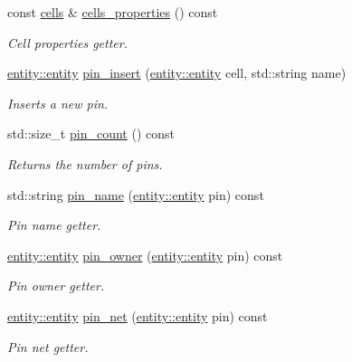 \begin{DoxyCompactItemize}
const \hyperlink{classophidian_1_1netlist_1_1cells}{cells} \& \hyperlink{classophidian_1_1netlist_1_1netlist_a0e57e192f8dcae8f15531f609274d3e5}{cells\-\_\-properties} () const 
\begin{DoxyCompactList}\small\item\em Cell properties getter. \end{DoxyCompactList}\item 
\hyperlink{classophidian_1_1entity_1_1entity}{entity\-::entity} \hyperlink{classophidian_1_1netlist_1_1netlist_a9469d7b2f01b912edf7e5efd91527503}{pin\-\_\-insert} (\hyperlink{classophidian_1_1entity_1_1entity}{entity\-::entity} cell, std\-::string name)
\begin{DoxyCompactList}\small\item\em Inserts a new pin. \end{DoxyCompactList}\item 
std\-::size\-\_\-t \hyperlink{classophidian_1_1netlist_1_1netlist_ad7ca89ecd797580236cbf4203c0298b7}{pin\-\_\-count} () const 
\begin{DoxyCompactList}\small\item\em Returns the number of pins. \end{DoxyCompactList}\item 
std\-::string \hyperlink{classophidian_1_1netlist_1_1netlist_a7e687a8525c7f16aad405f7fee0f8e8c}{pin\-\_\-name} (\hyperlink{classophidian_1_1entity_1_1entity}{entity\-::entity} pin) const 
\begin{DoxyCompactList}\small\item\em Pin name getter. \end{DoxyCompactList}\item 
\hyperlink{classophidian_1_1entity_1_1entity}{entity\-::entity} \hyperlink{classophidian_1_1netlist_1_1netlist_a7918cede2eea6fa451a93f41012f2152}{pin\-\_\-owner} (\hyperlink{classophidian_1_1entity_1_1entity}{entity\-::entity} pin) const 
\begin{DoxyCompactList}\small\item\em Pin owner getter. \end{DoxyCompactList}\item 
\hyperlink{classophidian_1_1entity_1_1entity}{entity\-::entity} \hyperlink{classophidian_1_1netlist_1_1netlist_aec916ca58338566b7d544dc3c63e27db}{pin\-\_\-net} (\hyperlink{classophidian_1_1entity_1_1entity}{entity\-::entity} pin) const 
\begin{DoxyCompactList}\small\item\em Pin net getter. \end{DoxyCompactList}\item 

\end{DoxyCompactItemize}
